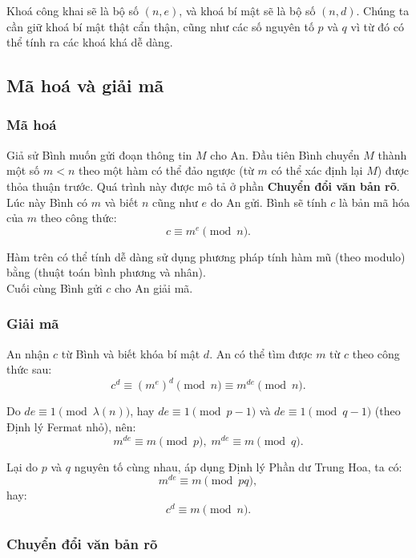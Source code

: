 Khoá công khai sẽ là bộ số $(n,e)$, và khoá bí mật sẽ là bộ số $(n,d)$. Chúng ta cần giữ khoá bí mật thật cẩn thận, cũng như các số nguyên tố $p$ và $q$ vì từ đó có thể tính ra các khoá khá dễ dàng.

\subsection{Mã hoá và giải mã}

\subsubsection*{Mã hoá}

Giả sử Bình muốn gửi đoạn thông tin $M$ cho An. Đầu tiên Bình chuyển $M$ thành một số $m<n$ theo một hàm có thể đảo ngược (từ $m$ có thể xác định lại $M$) được thỏa thuận trước. Quá trình này được mô tả ở phần \textbf{Chuyển đổi văn bản rõ}.\\

Lúc này Bình có $m$ và biết $n$ cũng như $e$ do An gửi. Bình sẽ tính $c$ là bản mã hóa của $m$ theo công thức:
$$
c\equiv m^e\pmod{n}.
$$

Hàm trên có thể tính dễ dàng sử dụng phương pháp tính hàm mũ (theo modulo) bằng (thuật toán bình phương và nhân).\\

Cuối cùng Bình gửi $c$ cho An giải mã.

\subsubsection*{Giải mã}

An nhận $c$ từ Bình và biết khóa bí mật $d$. An có thể tìm được $m$ từ $c$ theo công thức sau:
$$
c^d\equiv(m^e)^d\pmod{n}\equiv m^{de}\pmod{n}.
$$

Do $de\equiv 1\pmod{\lambda(n)}$, hay $de\equiv1\pmod{p-1}$ và $de\equiv1\pmod{q-1}$ (theo Định lý Fermat nhỏ), nên:
$$
m^{de}\equiv m\pmod{p},\;m^{de}\equiv m\pmod{q}.
$$

Lại do $p$ và $q$ nguyên tố cùng nhau, áp dụng Định lý Phần dư Trung Hoa, ta có:
$$
m^{de}\equiv m\pmod{pq},
$$
hay:
$$
c^d\equiv m\pmod{n}.
$$

\subsubsection*{Chuyển đổi văn bản rõ}

